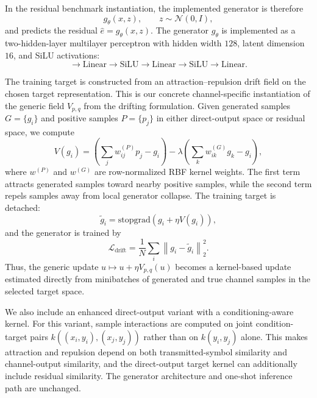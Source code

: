 In the residual benchmark instantiation, the implemented generator is therefore
\begin{equation}
g_\theta(x, z),
\qquad
z \sim \mathcal{N}(0, I),
\end{equation}
and predicts the residual \(\hat{e} = g_\theta(x, z)\).
The generator \(g_\theta\) is implemented as a two-hidden-layer multilayer perceptron with hidden width \(128\), latent dimension \(16\), and SiLU activations:
\begin{equation}
[x, z]
\rightarrow
\mathrm{Linear}
\rightarrow
\mathrm{SiLU}
\rightarrow
\mathrm{Linear}
\rightarrow
\mathrm{SiLU}
\rightarrow
\mathrm{Linear}.
\end{equation}

The training target is constructed from an attraction--repulsion drift field on the chosen target representation.
This is our concrete channel-specific instantiation of the generic field \(V_{p,q}\) from the drifting formulation.
Given generated samples \(G = \{g_i\}\) and positive samples \(P = \{p_j\}\) in either direct-output space or residual space, we compute
\begin{equation}
V(g_i)
=
\left(
\sum_j w^{(P)}_{ij} p_j - g_i
\right)
-
\lambda
\left(
\sum_k w^{(G)}_{ik} g_k - g_i
\right),
\end{equation}
where \(w^{(P)}\) and \(w^{(G)}\) are row-normalized RBF kernel weights.
The first term attracts generated samples toward nearby positive samples, while the second term repels samples away from local generator collapse.
The training target is detached:
\begin{equation}
\tilde{g}_i
=
\mathrm{stopgrad}\!\left(g_i + \eta V(g_i)\right),
\end{equation}
and the generator is trained by
\begin{equation}
\mathcal{L}_{\text{drift}}
=
\frac{1}{N}
\sum_i
\left\|
g_i - \tilde{g}_i
\right\|_2^2.
\end{equation}
Thus, the generic update \(u \mapsto u + \eta V_{p,q}(u)\) becomes a kernel-based update estimated directly from minibatches of generated and true channel samples in the selected target space.

We also include an enhanced direct-output variant with a conditioning-aware kernel.
For this variant, sample interactions are computed on joint condition-target pairs \(k((x_i,y_i),(x_j,y_j))\) rather than on \(k(y_i,y_j)\) alone.
This makes attraction and repulsion depend on both transmitted-symbol similarity and channel-output similarity, and the direct-output target kernel can additionally include residual similarity.
The generator architecture and one-shot inference path are unchanged.

